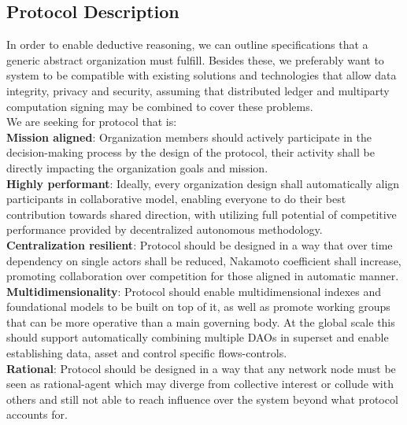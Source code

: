 \documentclass{article}
\begin{document}
\begin{CJK}{UTF8}{gbsn}
\begin{multicols}{2}
        \section{Protocol Description}

        In order to enable deductive reasoning, we can outline specifications that a generic abstract organization must fulfill. Besides these, we preferably want to system to be compatible with existing solutions and technologies that allow data integrity, privacy and security, assuming that distributed ledger and multiparty computation signing may be combined to cover these problems. \\
        We are seeking for protocol that is:\\
        \textbf{Mission aligned}: Organization members should actively participate in the decision-making process by the design of the protocol, their activity shall be directly impacting the organization goals and mission.\\
        \textbf{Highly performant}: Ideally, every organization design shall automatically align participants in collaborative model, enabling everyone to do their best contribution towards shared direction, with utilizing full potential of competitive performance provided by decentralized autonomous methodology.\\
        \textbf{Centralization resilient}: Protocol should be designed in a way that over time dependency on single actors shall be reduced, Nakamoto coefficient shall increase, promoting collaboration over competition for those aligned in automatic manner. \\
        \textbf{Multidimensionality}: Protocol should enable multidimensional indexes and foundational models to be built on top of it, as well as promote working groups that can be more operative than a main governing body. At the global scale this should support automatically combining multiple DAOs in superset and enable establishing data, asset and control specific flows-controls.\\
        \textbf{Rational}: Protocol should be designed in a way that any network node must be seen as rational-agent which may diverge from collective interest or collude with others and still not able to reach  influence over the system beyond what protocol accounts for.
        \\


\end{multicols}
\end{CJK}
\end{document}
